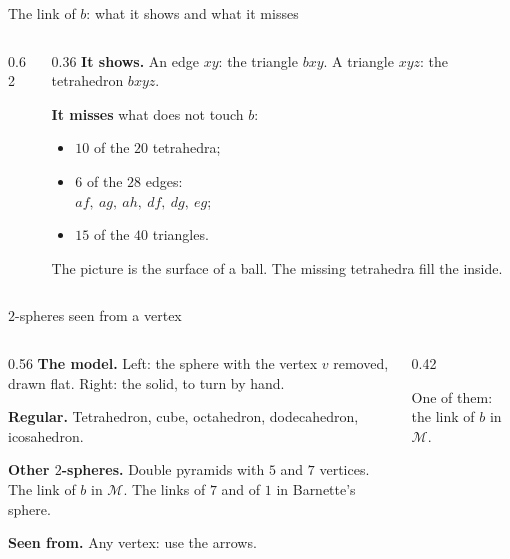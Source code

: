 \begin{frame}{The link of \(b\): what it shows and what it misses}
\begin{columns}[c]
\begin{column}{0.62\textwidth}\centering
{}
\end{column}
\begin{column}{0.36\textwidth}
\textbf{It shows.} An edge \(xy\): the triangle \(bxy\). A triangle \(xyz\): the tetrahedron \(bxyz\).
\par\bigskip
\textbf{It misses} what does not touch \(b\):
\begin{itemize}
\setlength{\itemsep}{4pt}
\item \(10\) of the \(20\) tetrahedra;
\item \(6\) of the \(28\) edges:\\ \(af,\ ag,\ ah,\ df,\ dg,\ eg\);
\item \(15\) of the \(40\) triangles.
\end{itemize}
\par\bigskip
The picture is the surface of a ball. The missing tetrahedra fill the inside.
\end{column}
\end{columns}
\end{frame}

\begin{frame}{\(2\)-spheres seen from a vertex}
\begin{columns}[c]
\begin{column}{0.56\textwidth}
\textbf{The model.} Left: the sphere with the vertex \(v\) removed, drawn flat. Right: the solid, to turn by hand.
\par\medskip
\textbf{Regular.} Tetrahedron, cube, octahedron, dodecahedron, icosahedron.
\par\medskip
\textbf{Other \(2\)-spheres.} Double pyramids with \(5\) and \(7\) vertices. The link of \(b\) in \(\mathcal M\). The links of \(7\) and of \(1\) in Barnette's sphere.
\par\medskip
\textbf{Seen from.} Any vertex: use the arrows.
\end{column}
\begin{column}{0.42\textwidth}\centering
{}
\par
{\small One of them: the link of \(b\) in \(\mathcal M\).}
\end{column}
\end{columns}
\end{frame}

